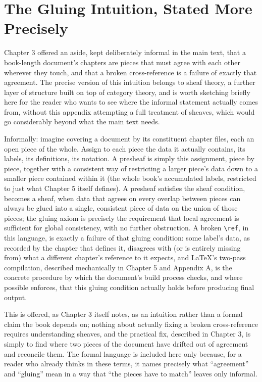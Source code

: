 \hypertarget{b.5-the-gluing-intuition-stated-more-precisely}{%
\section{The Gluing Intuition, Stated More Precisely}\label{b.5-the-gluing-intuition-stated-more-precisely}}

Chapter 3 offered an aside, kept deliberately informal in the main text, that a book-length document's chapters are pieces that must agree with each other wherever they touch, and that a broken cross-reference is a failure of exactly that agreement. The precise version of this intuition belongs to sheaf theory, a further layer of structure built on top of category theory, and is worth sketching briefly here for the reader who wants to see where the informal statement actually comes from, without this appendix attempting a full treatment of sheaves, which would go considerably beyond what the main text needs.

Informally: imagine covering a document by its constituent chapter files, each an open piece of the whole. Assign to each piece the data it actually contains, its labels, its definitions, its notation. A presheaf is simply this assignment, piece by piece, together with a consistent way of restricting a larger piece's data down to a smaller piece contained within it (the whole book's accumulated labels, restricted to just what Chapter 5 itself defines). A presheaf satisfies the sheaf condition, becomes a sheaf, when data that agrees on every overlap between pieces can always be glued into a single, consistent piece of data on the union of those pieces; the gluing axiom is precisely the requirement that local agreement is sufficient for global consistency, with no further obstruction. A broken \texttt{\textbackslash{}ref}, in this language, is exactly a failure of that gluing condition: some label's data, as recorded by the chapter that defines it, disagrees with (or is entirely missing from) what a different chapter's reference to it expects, and LaTeX's two-pass compilation, described mechanically in Chapter 5 and Appendix A, is the concrete procedure by which the document's build process checks, and where possible enforces, that this gluing condition actually holds before producing final output.

This is offered, as Chapter 3 itself notes, as an intuition rather than a formal claim the book depends on; nothing about actually fixing a broken cross-reference requires understanding sheaves, and the practical fix, described in Chapter 3, is simply to find where two pieces of the document have drifted out of agreement and reconcile them. The formal language is included here only because, for a reader who already thinks in these terms, it names precisely what ``agreement'' and ``gluing'' mean in a way that ``the pieces have to match'' leaves only informal.

